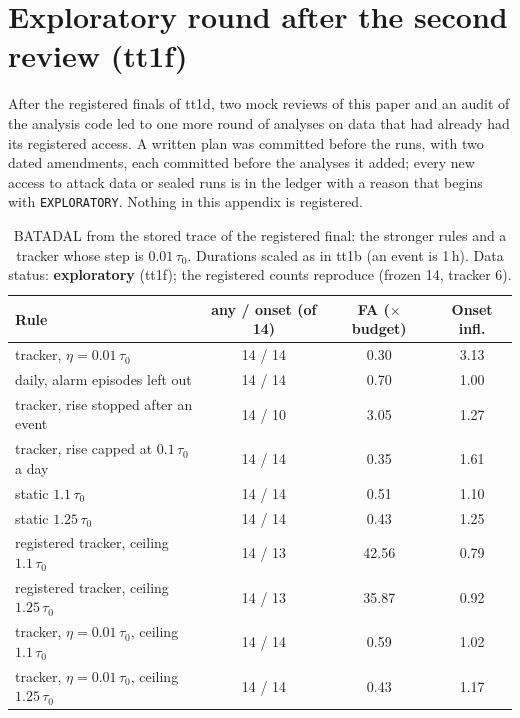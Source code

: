 \documentclass[sigconf,review,anonymous]{acmart}
\begin{document}
\FloatBarrier
\section{Exploratory round after the second review (tt1f)}
\label{app:tt1f}

After the registered finals of tt1d, two mock reviews of this paper and an audit of the analysis code
led to one more round of analyses on data that had already had its registered access. A written plan was
committed before the runs, with two dated amendments, each committed before the analyses it added; every
new access to attack data or sealed runs is in the ledger with a reason that begins with
\texttt{EXPLORATORY}. Nothing in this appendix is registered.

\begin{table}[t]
\caption{BATADAL from the stored trace of the registered final: the stronger rules and a tracker whose
step is $0.01\,\tau_0$. Durations scaled as in tt1b (an event is 1\,h). Data status: \textbf{exploratory}
(tt1f); the registered counts reproduce (frozen 14, tracker 6).}
\label{tab:batadalstrong}
\small
\begin{tabularx}{\columnwidth}{@{}Lccc@{}}
\toprule
Rule & any / onset (of 14) & FA ($\times$ budget) & Onset infl. \\
\midrule
tracker, $\eta = 0.01\,\tau_0$ & 14 / 14 & 0.30 & 3.13 \\
daily, alarm episodes left out & 14 / 14 & 0.70 & 1.00 \\
tracker, rise stopped after an event & 14 / 10 & 3.05 & 1.27 \\
tracker, rise capped at $0.1\,\tau_0$ a day & 14 / 14 & 0.35 & 1.61 \\
static $1.1\,\tau_0$ & 14 / 14 & 0.51 & 1.10 \\
static $1.25\,\tau_0$ & 14 / 14 & 0.43 & 1.25 \\
registered tracker, ceiling $1.1\,\tau_0$ & 14 / 13 & 42.56 & 0.79 \\
registered tracker, ceiling $1.25\,\tau_0$ & 14 / 13 & 35.87 & 0.92 \\
tracker, $\eta = 0.01\,\tau_0$, ceiling $1.1\,\tau_0$ & 14 / 14 & 0.59 & 1.02 \\
tracker, $\eta = 0.01\,\tau_0$, ceiling $1.25\,\tau_0$ & 14 / 14 & 0.43 & 1.17 \\
\bottomrule
\end{tabularx}
\end{table}
\end{document}
